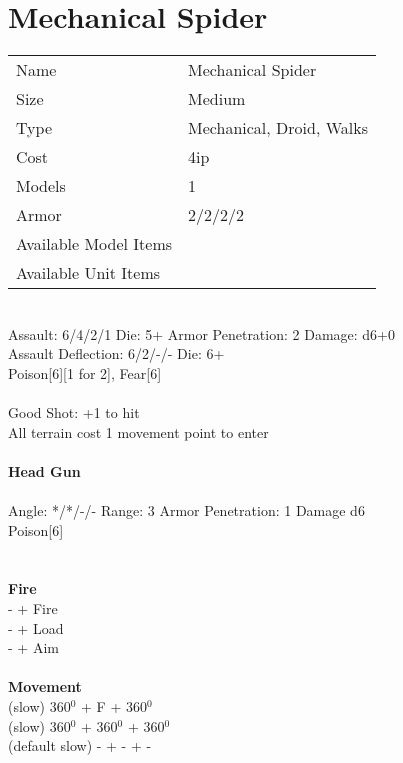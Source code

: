 






\pagebreak

\section{ Mechanical Spider }

\begin{tabular}{ll}
  Name & Mechanical Spider \\
  Size & Medium\\
  Type & Mechanical, Droid, Walks\\
  Cost & 4ip\\
  Models & 1\\
  Armor & 2/2/2/2\\
  Available Model Items &  \\
  Available Unit Items &  \\
\end{tabular}

\ \\
Assault: 6/4/2/1 Die: 5+ Armor Penetration: 2 Damage: d6+0 \\
Assault Deflection: 6/2/-/- Die: 6+\\
\indent Poison[6][1 for 2], Fear[6] \\
\ \\
Good Shot: +1 to hit\\ All terrain cost 1 movement point to enter
\ \\
\ \\
{\bf Head Gun } \\
\ \\
Angle: */*/-/- Range: 3 Armor Penetration: 1 Damage d6\\ Poison[6] \\
\indent  \\





\ \\ {\bf Fire  } \\
- + Fire \\
- + Load \\
- + Aim \\
\ \\ {\bf Movement } \\
(slow) 360$^0$ + F + 360$^0$ \\
(slow) 360$^0$ + 360$^0$ + 360$^0$ \\
(default slow) - + - + - \\




